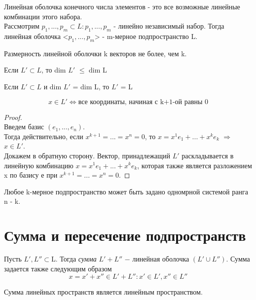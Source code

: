 Линейная оболочка конечного числа элементов - это все возможные линейные комбинации этого набора.\\

Рассмотрим $p_1, ..., p_m \subset L : p_1, ..., p_m$ - линейно независимый набор. Тогда линейная оболочка <$p_1, ..., p_m$> - m-мерное подпространство L.\\

\begin{proposition}
    Размерность линейной оболочки k векторов не более, чем k.
\end{proposition}

\begin{proposition}
    Если $L' \subset L$, то dim $L'$ $\leq$ dim L
\end{proposition}
    
\begin{proposition}
    Если $L' \subset L$ и dim $L'$ = dim L, то $L'$ = L
\end{proposition}

\begin{theorem}
    \[
    x \in L' \Longleftrightarrow \text{все координаты, начиная с k+1-ой равны 0}
    \]
\end{theorem}
\begin{proof}
\tab\\

    Введем базис $(e_1, ..., e_n)$.\\
    
    Тогда действительно, если $x^{k + 1} = ... = x^n = 0$, то $x = x^1e_1 + ... + x^ke_k$ $\Longrightarrow$ $x\in L'$.\\

    Докажем в обратную сторону. Вектор, принадлежащий $L'$ раскладывается в линейную комбинацию $x = x^1e_1 + ... + x^ke_k$, которая также является разложением x по базису е при $x^{k + 1} = ... = x^n = 0$.
\end{proof}

Любое k-мерное подпространство может быть задано одномрной системой ранга n - k.\\

\section{Сумма и пересечение подпространств}

\begin{definition}
    Пусть $L', L''\subset$L. Тогда \textit{сумма} $L' + L''$ $-$ линейная оболочка $(L'\cup L'')$. Сумма задается также следующим образом
    \[
    x = x' + x''\in L' + L'' : x' \in L', x'' \in L''
    \]
\end{definition}
Сумма линейных пространств является линейным пространством.\\

